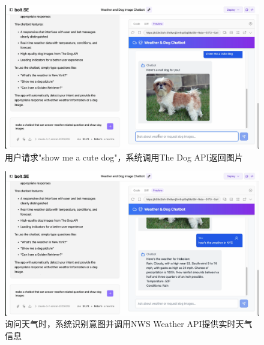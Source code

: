 \begin{figure}
  \centering
  \includegraphics[width=\textwidth]{figures/screenshots/api-actions/demo_dog_preview.png}
  \caption{用户请求"show me a cute dog"，系统调用The Dog API返回图片}
  \label{fig:demo_dog}
\end{figure}

\begin{figure}
  \centering
  \includegraphics[width=\textwidth]{figures/screenshots/api-actions/demo_weather_preview.png}
  \caption{询问天气时，系统识别意图并调用NWS Weather API提供实时天气信息}
  \label{fig:demo_weather}
\end{figure}
